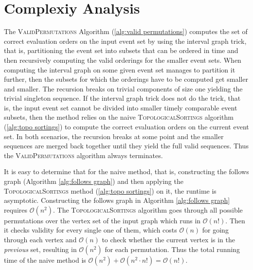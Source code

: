 \section{Complexiy Analysis}
The \textsc{ValidPermutations} Algorithm (\ref{alg:valid permutations}) computes the set of correct evaluation orders on the input event set by using the interval graph trick, that is, partitioning the event set into subsets that can be ordered in time and then recursively computing the valid orderings for the smaller event sets.
When computing the interval graph on some given event set manages to partition it further, then the subsets for which the orderings have to be computed get smaller and smaller.
The recursion breaks on trivial components of size one yielding the trivial singleton sequence.
If the interval graph trick does not do the trick, that is, the input event set cannot be divided into smaller timely comparable event subsets, then the method relies on the naive \textsc{TopologicalSortings} algorithm (\ref{alg:topo sortings}) to compute the correct evaluation orders on the current event set.
In both scenarios, the recursion breaks at some point and the smaller sequences are merged back together until they yield the full valid sequences.
Thus the \textsc{ValidPermutations} algorithm always terminates.

It is easy to determine that for the naive method, that is, constructing the follows graph (Algorithm \ref{alg:follows graph}) and then applying the \textsc{TopologicalSortings} method (\ref{alg:topo sortings}) on it, the runtime is asymptotic.
Constructing the follows graph in Algorithm \ref{alg:follows graph} requires $\mathcal{O}(n^2)$.
The \textsc{TopologicalSortings} algorithm goes through all possible permutations over the vertex set of the input graph which runs in $\mathcal{O}(n!)$.
Then it checks validity for every single one of them, which costs $\mathcal{O}(n)$ for going through each vertex and $\mathcal{O}(n)$ to check whether the current vertex is in the \textit{previous} set, resulting in $\mathcal{O}(n^2)$ for each permutation.
Thus the total running time of the naive method is $\mathcal{O}(n^2) + \mathcal{O}(n^2 \cdot n!) = \mathcal{O}(n!)$.

